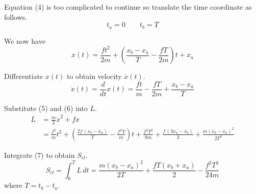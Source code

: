 \documentclass[12pt]{article}
\begin{document}
Equation (4) is too complicated to continue so translate the time coordinate as follows.
\begin{equation*}
t_a=0
\qquad
t_b=T
\end{equation*}

We now have
\begin{equation*}
x(t)=\frac{ft^2}{2m}+\left(\frac{x_b-x_a}{T}-\frac{fT}{2m}\right)t+x_a
\tag{5}
\end{equation*}

Differentiate $x(t)$ to obtain velocity $\dot x(t)$.
\begin{equation*}
\dot x(t)=
\frac{d}{dt}x(t)=\frac{ft}{m}-\frac{fT}{2m}+\frac{x_b-x_a}{T}
\tag{6}
\end{equation*}

Substitute (5) and (6) into $L$.
\begin{align*}
L&=\frac{m}{2}\dot x^2+fx
\\[1ex]
&=\frac{f^2}{m}t^2
+\left(\frac{2f\,(x_b-x_a)}{T}-\frac{f^2T}{m}\right)t
+\frac{f^2T^2}{8m}
+\frac{f\,(3x_a-x_b)}{2}
+\frac{m(x_b-x_a)^2}{2T^2}
\tag{7}
\end{align*}

Integrate (7) to obtain $S_{cl}$.
\begin{equation*}
S_{cl}=\int_0^T L\,dt
=\frac{m(x_b-x_a)^2}{2T}+\frac{fT(x_b+x_a)}{2}-\frac{f^2T^3}{24m}
\tag{8}
\end{equation*}
where $T=t_b-t_a$.
\end{document}
